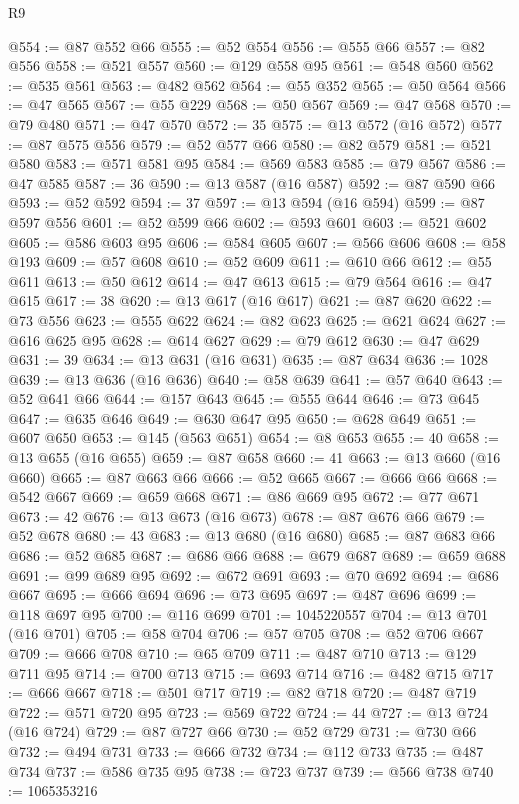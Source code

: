 \begin{lexlean}{R9}
\begin{coremodule}
@554 := @87 @552 @66
@555 := @52 @554
@556 := @555 @66
@557 := @82 @556
@558 := @521 @557
@560 := @129 @558 @95
@561 := @548 @560
@562 := @535 @561
@563 := @482 @562
@564 := @55 @352
@565 := @50 @564
@566 := @47 @565
@567 := @55 @229
@568 := @50 @567
@569 := @47 @568
@570 := @79 @480
@571 := @47 @570
@572 := 35
@575 := @13 @572 (@16 @572)
@577 := @87 @575 @556
@579 := @52 @577 @66
@580 := @82 @579
@581 := @521 @580
@583 := @571 @581 @95
@584 := @569 @583
@585 := @79 @567
@586 := @47 @585
@587 := 36
@590 := @13 @587 (@16 @587)
@592 := @87 @590 @66
@593 := @52 @592
@594 := 37
@597 := @13 @594 (@16 @594)
@599 := @87 @597 @556
@601 := @52 @599 @66
@602 := @593 @601
@603 := @521 @602
@605 := @586 @603 @95
@606 := @584 @605
@607 := @566 @606
@608 := @58 @193
@609 := @57 @608
@610 := @52 @609
@611 := @610 @66
@612 := @55 @611
@613 := @50 @612
@614 := @47 @613
@615 := @79 @564
@616 := @47 @615
@617 := 38
@620 := @13 @617 (@16 @617)
@621 := @87 @620
@622 := @73 @556
@623 := @555 @622
@624 := @82 @623
@625 := @621 @624
@627 := @616 @625 @95
@628 := @614 @627
@629 := @79 @612
@630 := @47 @629
@631 := 39
@634 := @13 @631 (@16 @631)
@635 := @87 @634
@636 := 1028
@639 := @13 @636 (@16 @636)
@640 := @58 @639
@641 := @57 @640
@643 := @52 @641 @66
@644 := @157 @643
@645 := @555 @644
@646 := @73 @645
@647 := @635 @646
@649 := @630 @647 @95
@650 := @628 @649
@651 := @607 @650
@653 := @145 (@563 @651)
@654 := @8 @653
@655 := 40
@658 := @13 @655 (@16 @655)
@659 := @87 @658
@660 := 41
@663 := @13 @660 (@16 @660)
@665 := @87 @663 @66
@666 := @52 @665
@667 := @666 @66
@668 := @542 @667
@669 := @659 @668
@671 := @86 @669 @95
@672 := @77 @671
@673 := 42
@676 := @13 @673 (@16 @673)
@678 := @87 @676 @66
@679 := @52 @678
@680 := 43
@683 := @13 @680 (@16 @680)
@685 := @87 @683 @66
@686 := @52 @685
@687 := @686 @66
@688 := @679 @687
@689 := @659 @688
@691 := @99 @689 @95
@692 := @672 @691
@693 := @70 @692
@694 := @686 @667
@695 := @666 @694
@696 := @73 @695
@697 := @487 @696
@699 := @118 @697 @95
@700 := @116 @699
@701 := 1045220557
@704 := @13 @701 (@16 @701)
@705 := @58 @704
@706 := @57 @705
@708 := @52 @706 @667
@709 := @666 @708
@710 := @65 @709
@711 := @487 @710
@713 := @129 @711 @95
@714 := @700 @713
@715 := @693 @714
@716 := @482 @715
@717 := @666 @667
@718 := @501 @717
@719 := @82 @718
@720 := @487 @719
@722 := @571 @720 @95
@723 := @569 @722
@724 := 44
@727 := @13 @724 (@16 @724)
@729 := @87 @727 @66
@730 := @52 @729
@731 := @730 @66
@732 := @494 @731
@733 := @666 @732
@734 := @112 @733
@735 := @487 @734
@737 := @586 @735 @95
@738 := @723 @737
@739 := @566 @738
@740 := 1065353216

\end{coremodule}
\end{lexlean}
